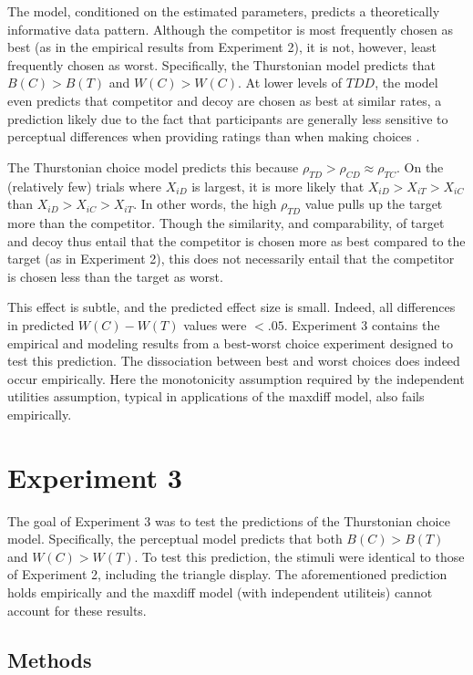 The model, conditioned on the estimated parameters, predicts a theoretically informative data pattern. Although the competitor is most frequently chosen as best (as in the empirical results from Experiment 2), it is not, however, least frequently chosen as worst. Specifically, the Thurstonian model predicts that $B(C)>B(T)$ and $W(C)>W(C)$. At lower levels of $TDD$, the model even predicts that competitor and decoy are chosen as best at similar rates, a prediction likely due to the fact that participants are generally less sensitive to perceptual differences when providing ratings than when making choices \parencite{gronau2023choice}.

The Thurstonian choice model predicts this because $\rho_{TD}>\rho_{CD}\approx\rho_{TC}$. On the (relatively few) trials where $X_{iD}$ is largest, it is more likely that $X_{iD}>X_{iT}>X_{iC}$ than $X_{iD}>X_{iC}>X_{iT}$. In other words, the high $\rho_{TD}$ value pulls up the target more than the competitor. Though the similarity, and comparability, of target and decoy thus entail that the competitor is chosen more as best compared to the target (as in Experiment 2), this does not necessarily entail that the competitor is chosen less than the target as worst.

This effect is subtle, and the predicted effect size is small. Indeed, all differences in predicted $W(C)-W(T)$ values were $<.05$. Experiment 3 contains the empirical and modeling results from a best-worst choice experiment designed to test this prediction. The dissociation between best and worst choices does indeed occur empirically. Here the monotonicity assumption required by the independent utilities assumption, typical in applications of the maxdiff model, also fails empirically.

\section{Experiment 3}

The goal of Experiment 3 was to test the predictions of the Thurstonian choice model. Specifically, the perceptual model predicts that both $B(C)>B(T)$ and $W(C)>W(T)$. To test this prediction, the stimuli were identical to those of Experiment 2, including the triangle display. The aforementioned prediction holds empirically and the maxdiff model (with independent utiliteis) cannot account for these results.

\subsection{Methods}

